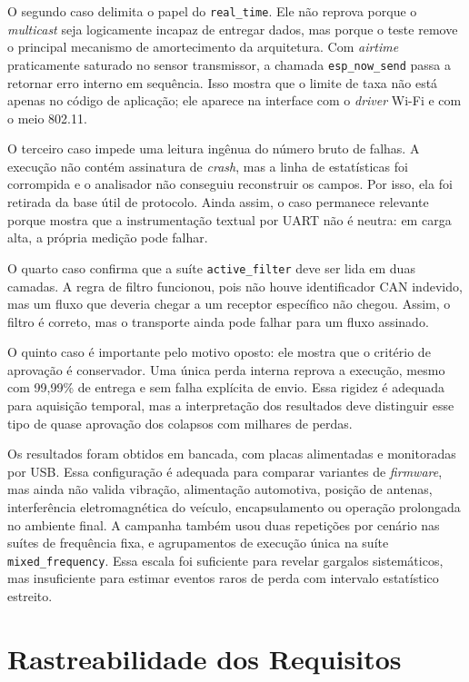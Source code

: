 O segundo caso delimita o papel do \texttt{real\_time}. Ele não reprova porque o
\emph{multicast} seja logicamente incapaz de entregar dados, mas porque o teste remove o
principal mecanismo de amortecimento da arquitetura. Com \emph{airtime} praticamente
saturado no sensor transmissor, a chamada \texttt{esp\_now\_send} passa a retornar erro interno em
sequência. Isso mostra que o limite de taxa não está apenas no código de
aplicação; ele aparece na interface com o \emph{driver} Wi-Fi e com o meio 802.11.

O terceiro caso impede uma leitura ingênua do número bruto de falhas. A execução
não contém assinatura de \emph{crash}, mas a linha de estatísticas foi corrompida e o
analisador não conseguiu reconstruir os campos. Por isso, ela foi retirada da
base útil de protocolo. Ainda assim, o caso permanece relevante porque mostra
que a instrumentação textual por UART não é neutra: em carga alta, a própria
medição pode falhar.

O quarto caso confirma que a suíte \texttt{active\_filter} deve ser lida em duas
camadas. A regra de filtro funcionou, pois não houve identificador CAN indevido, mas um
fluxo que deveria chegar a um receptor específico não chegou. Assim, o filtro é
correto, mas o transporte ainda pode falhar para um fluxo assinado.

O quinto caso é importante pelo motivo oposto: ele mostra que o critério de
aprovação é conservador. Uma única perda interna reprova a execução, mesmo com
99,99\% de entrega e sem falha explícita de envio. Essa rigidez é adequada para
aquisição temporal, mas a interpretação dos resultados deve distinguir esse tipo
de quase aprovação dos colapsos com milhares de perdas.

Os resultados foram obtidos em bancada, com placas alimentadas e monitoradas por
USB. Essa configuração é adequada para comparar variantes de \emph{firmware}, mas ainda
não valida vibração, alimentação automotiva, posição de antenas, interferência
eletromagnética do veículo, encapsulamento ou operação prolongada no ambiente
final. A campanha também usou duas repetições por cenário nas suítes de frequência
fixa, e agrupamentos de execução única na suíte \texttt{mixed\_frequency}. Essa
escala foi suficiente para revelar gargalos sistemáticos, mas insuficiente para
estimar eventos raros de perda com intervalo estatístico estreito.

\section{Rastreabilidade dos Requisitos}

